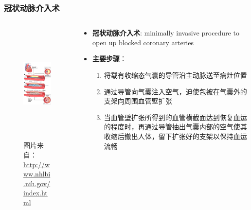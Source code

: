 \begin{frame}
\frametitle{冠状动脉介入术}
\begin{columns}[onlytextwidth]
\begin{column}{0.4\textwidth}
\begin{figure}[t]
\includegraphics[height=170pt]{../../Figures/background/phauthuatmachmau_stent.eps}
\caption[冠状动脉介入术]{图片来自：\url{http://www.nhlbi.nih.gov/index.html}}
\end{figure}
\end{column}
\begin{column}{0.5\textwidth}
\begin{itemize}
\item \textbf{冠状动脉介入术}: minimally invasive procedure to open up blocked coronary arteries
\item \textbf{主要步骤}：
\begin{enumerate}[A]
\item \footnotesize{将载有收缩态气囊的导管沿主动脉送至病灶位置}
\item \footnotesize{通过导管向气囊注入空气，迫使包被在气囊外的支架向周围血管壁扩张}
\item \footnotesize{当血管壁扩张所得到的血管横截面达到恢复血运的程度时，再通过导管抽出气囊内部的空气使其收缩后撤出人体，留下扩张好的支架以保持血运流畅}
\end{enumerate}
\end{itemize}
\end{column}
\end{columns}
\end{frame}

\begin{frame}

\end{frame}

\begin{frame}

\end{frame}